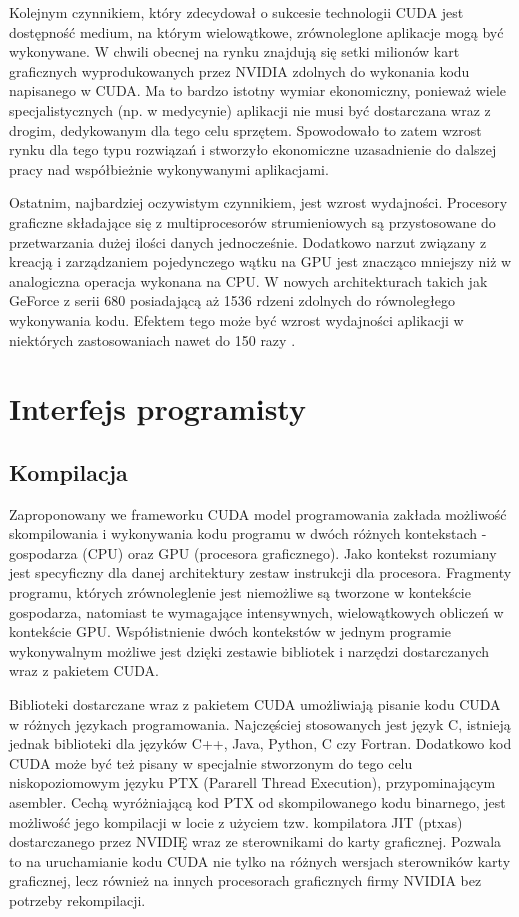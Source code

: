 Kolejnym czynnikiem, który zdecydował o sukcesie technologii CUDA jest
dostępność medium, na którym wielowątkowe, zrównoleglone aplikacje mogą być
wykonywane. W chwili obecnej na rynku znajdują się setki milionów kart
graficznych wyprodukowanych przez NVIDIA zdolnych do wykonania kodu napisanego w
CUDA. Ma to bardzo istotny wymiar ekonomiczny, ponieważ wiele specjalistycznych
(np. w medycynie) aplikacji nie musi być dostarczana wraz z drogim,
	dedykowanym dla tego celu sprzętem. Spowodowało to zatem wzrost rynku dla
	tego typu rozwiązań i stworzyło ekonomiczne uzasadnienie do dalszej pracy
	nad współbieżnie wykonywanymi aplikacjami.

Ostatnim, najbardziej oczywistym czynnikiem, jest wzrost wydajności. Procesory
graficzne składające się z multiprocesorów strumieniowych są przystosowane do
przetwarzania dużej ilości danych jednocześnie. Dodatkowo narzut związany z
kreacją i zarządzaniem pojedynczego wątku na GPU jest znacząco mniejszy niż w
analogiczna operacja wykonana na CPU.  W nowych architekturach takich jak
GeForce z serii 680 posiadającą aż 1536 rdzeni zdolnych do równoległego
wykonywania kodu.  Efektem tego może być wzrost wydajności aplikacji w
niektórych zastosowaniach nawet do 150 razy \cite{prez}.

\section{Interfejs programisty}

\subsection{Kompilacja}

Zaproponowany we frameworku CUDA model programowania zakłada możliwość
skompilowania i wykonywania kodu programu w dwóch różnych kontekstach -
gospodarza (CPU) oraz GPU (procesora graficznego)\cite{Nvillb}. Jako kontekst rozumiany jest
specyficzny dla danej architektury zestaw instrukcji dla procesora. Fragmenty
programu, których zrównoleglenie jest niemożliwe są tworzone w kontekście
gospodarza,
	natomiast te wymagające intensywnych, wielowątkowych obliczeń w kontekście
	GPU.  Współistnienie dwóch kontekstów w jednym programie wykonywalnym
	możliwe jest dzięki zestawie bibliotek i narzędzi dostarczanych wraz z
	pakietem CUDA.

Biblioteki dostarczane wraz z pakietem CUDA umożliwiają pisanie kodu CUDA w różnych
językach programowania. Najczęściej stosowanych jest język C, istnieją jednak biblioteki
dla języków C++, Java, Python, C czy Fortran. Dodatkowo kod CUDA może być też pisany w specjalnie stworzonym do tego celu
niskopoziomowym języku PTX (Pararell Thread Execution), przypominającym asembler.
Cechą wyróżniającą kod PTX od skompilowanego kodu binarnego, jest możliwość jego
kompilacji w locie z użyciem tzw. kompilatora JIT (ptxas) dostarczanego przez
NVIDIĘ wraz ze sterownikami do karty graficznej. Pozwala to na uruchamianie kodu
CUDA nie tylko na różnych wersjach sterowników karty graficznej, lecz również na
innych procesorach graficznych firmy NVIDIA bez potrzeby rekompilacji.

